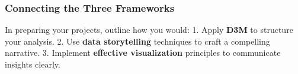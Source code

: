 \documentclass[
  11pt,
]{article}
\begin{document}
\subsubsection{\texorpdfstring{\textbf{Connecting the Three
Frameworks}}{Connecting the Three Frameworks}}\label{connecting-the-three-frameworks}

In preparing your projects, outline how you would: 1. Apply \textbf{D3M}
to structure your analysis. 2. Use \textbf{data storytelling} techniques
to craft a compelling narrative. 3. Implement \textbf{effective
visualization} principles to communicate insights clearly.
\end{document}
